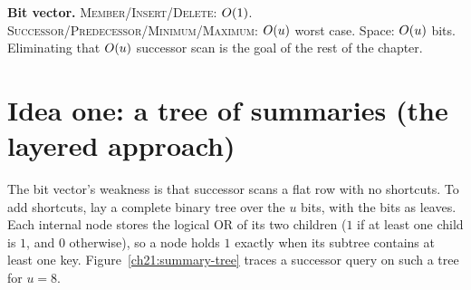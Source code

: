 \begin{complexitybox}
\textbf{Bit vector.}
\textsc{Member}/\textsc{Insert}/\textsc{Delete}: $O(1)$.
\textsc{Successor}/\textsc{Predecessor}/\textsc{Minimum}/\textsc{Maximum}:
$O(u)$ worst case. Space: $O(u)$ bits.
Eliminating that $O(u)$ successor scan is the goal of the rest of the chapter.
\end{complexitybox}

\section{Idea one: a tree of summaries (the layered approach)}

The bit vector's weakness is that successor scans a flat row with no
shortcuts. To add shortcuts, lay a complete binary tree over the $u$ bits, with the
bits as leaves. Each internal node stores the logical OR of its two children ($1$ if at least one child is $1$, and $0$ otherwise), so a node holds
$1$ exactly when its subtree contains at least one key.
Figure~\ref{ch21:summary-tree} traces a successor query on such a tree for $u = 8$.

